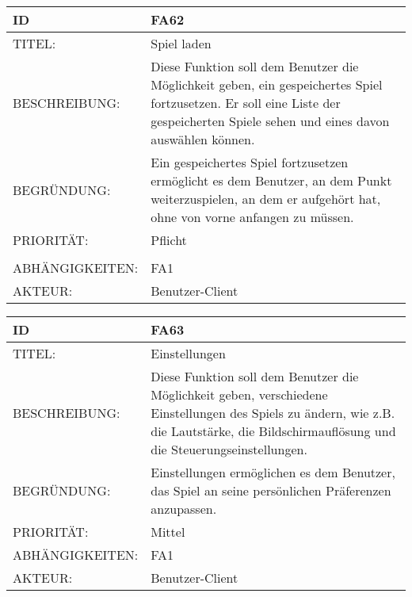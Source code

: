 \documentclass{uulm-assignment}
\begin{document}
     \begin{tabularx}{\textwidth}{|l|X |} \hline
        \textbf{ID} & \textbf{FA62}\\
        \hline
        TITEL: &  Spiel laden
         \\
        \hline
        BESCHREIBUNG: & Diese Funktion soll dem Benutzer die Möglichkeit geben, ein gespeichertes Spiel fortzusetzen. Er soll eine Liste der gespeicherten Spiele sehen und eines davon auswählen können.
        \\
        \hline
        BEGRÜNDUNG: & Ein gespeichertes Spiel fortzusetzen ermöglicht es dem Benutzer, an dem Punkt weiterzuspielen, an dem er aufgehört hat, ohne von vorne anfangen zu müssen.
         \\
        \hline
        PRIORITÄT: & Pflicht \\
        \\
        \hline
        ABHÄNGIGKEITEN: & FA1
         \\
        \hline
        AKTEUR: & Benutzer-Client
         \\
        \hline
    \end{tabularx}
    
    \begin{tabularx}{\textwidth}{|l|X |} \hline
        \textbf{ID} & \textbf{FA63}\\
        \hline
        TITEL: & Einstellungen
         \\
        \hline
        BESCHREIBUNG: & Diese Funktion soll dem Benutzer die Möglichkeit geben, verschiedene Einstellungen des Spiels zu ändern, wie z.B. die Lautstärke, die Bildschirmauflösung und die Steuerungseinstellungen.
        \\
        \hline
        BEGRÜNDUNG: & Einstellungen ermöglichen es dem Benutzer, das Spiel an seine persönlichen Präferenzen anzupassen.
         \\
        \hline
        PRIORITÄT: & Mittel
        \\
        \hline
        ABHÄNGIGKEITEN: & FA1
         \\
        \hline
        AKTEUR: & Benutzer-Client
         \\
        \hline
    \end{tabularx}
    
\end{document}
